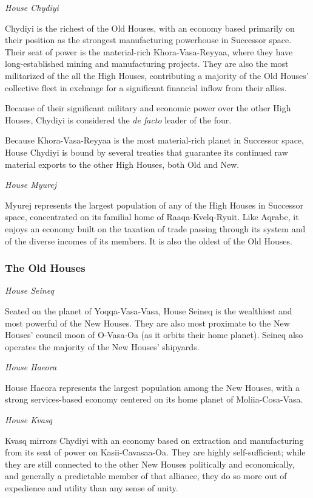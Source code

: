 \documentclass[11pt]{report}
\begin{document}
    \noindent
    \emph{House Chydiyi}

    Chydiyi is the richest of the Old Houses, with an economy based primarily on their position as the strongest manufacturing powerhouse in Successor space. Their seat of power is the material-rich Khora-Vasa-Reyyaa, where they have long-established mining and manufacturing projects. They are also the most militarized of the all the High Houses, contributing a majority of the Old Houses' collective fleet in exchange for a significant financial inflow from their allies.

    Because of their significant military and economic power over the other High Houses, Chydiyi is considered the \emph{de facto} leader of the four.

    Because Khora-Vasa-Reyyaa is the most material-rich planet in Successor space, House Chydiyi is bound by several treaties that guarantee its continued raw material exports to the other High Houses, both Old and New.
    \bigskip

    \noindent
    \emph{House Myurej}

    Myurej represents the largest population of any of the High Houses in Successor space, concentrated on its familial home of Raaqa-Kvelq-Ryuit. Like Aqrabe, it enjoys an economy built on the taxation of trade passing through its system and of the diverse incomes of its members. It is also the oldest of the Old Houses. 
    \bigskip

    \subsubsection{The Old Houses}

    \noindent
    \emph{House Seineq}

    Seated on the planet of Yoqqa-Vasa-Vasa, House Seineq is the wealthiest and most powerful of the New Houses. They are also most proximate to the New Houses' council moon of O-Vasa-Oa (as it orbits their home planet). Seineq also operates the majority of the New Houses' shipyards.
    \bigskip

    \noindent
    \emph{House Haeora}

    House Haeora represents the largest population among the New Houses, with a strong services-based economy centered on its home planet of Moliia-Cosa-Vasa.
    \bigskip

    \noindent
    \emph{House Kvasq}

    Kvasq mirrors Chydiyi with an economy based on extraction and manufacturing from its seat of power on Kasii-Cavasaa-Oa. They are highly self-sufficient; while they are still connected to the other New Houses politically and economically, and generally a predictable member of that alliance, they do so more out of expedience and utility than any sense of unity.
    \bigskip
\end{document}
